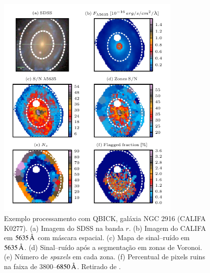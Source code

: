 \begin{figure}
	\includegraphics[width=0.8\textwidth]{figuras/zones-K0277}
	\caption[Exemplo processamento com QBICK, galáxia K0277]
	{Exemplo processamento com QBICK, galáxia NGC 2916 (CALIFA K0277). (a) Imagem
	do SDSS na banda $r$. (b) Imagem do CALIFA em $5635\,\text{\normalfont\AA}$ com máscara
	espacial. (c) Mapa de sinal--ruído em $5635\,\text{\normalfont\AA}$. (d) Sinal--ruído após
	a segmentação em zonas de Voronoi. (e) Número de {\em spaxels} em cada zona.
	(f) Percentual de pixels ruins na faixa de $3800$--$6850\,\text{\normalfont\AA}$. Retirado
	de \citet{CidFernandes2013}.}
	\label{fig:QBICK}
\end{figure}

\subsection{\starlight}
\label{sec:ifs:starlight}

